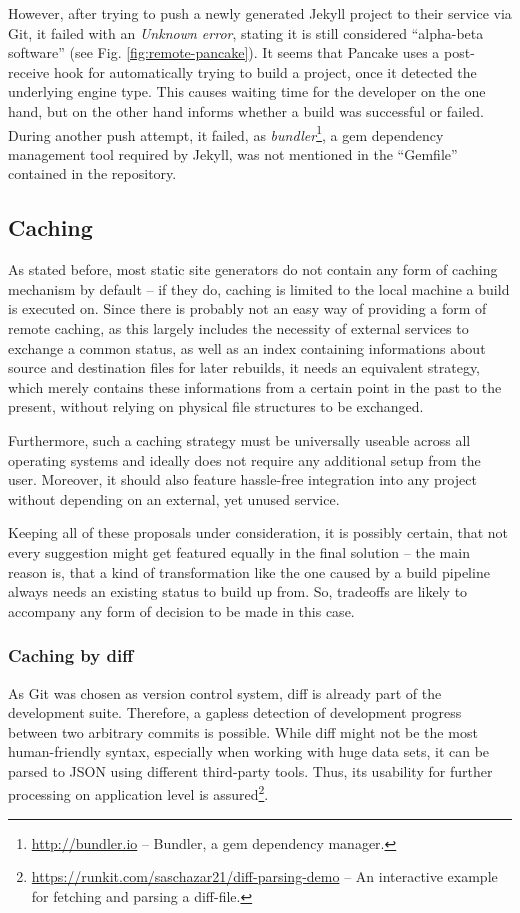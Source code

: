 However, after trying to push a newly generated Jekyll project to their service via Git, it failed with an \emph{Unknown error}, stating it is still considered ``alpha-beta software'' (see Fig. \ref{fig:remote-pancake}). It seems that Pancake uses a post-receive hook for automatically trying to build a project, once it detected the underlying engine type. This causes waiting time for the developer on the one hand, but on the other hand informs whether a build was successful or failed. During another push attempt, it failed, as \emph{bundler}\footnote{\url{http://bundler.io} -- Bundler, a gem dependency manager.}, a gem dependency management tool required by Jekyll, was not mentioned in the ``Gemfile'' contained in the repository.


\subsection{Caching}
\label{sec:solutions-caching}

As stated before, most static site generators do not contain any form of caching mechanism by default -- if they do, caching is limited to the local machine a build is executed on. Since there is probably not an easy way of providing a form of remote caching, as this largely includes the necessity of external services to exchange a common status, as well as an index containing informations about source and destination files for later rebuilds, it needs an equivalent strategy, which merely contains these informations from a certain point in the past to the present, without relying on physical file structures to be exchanged.

Furthermore, such a caching strategy must be universally useable across all operating systems and ideally does not require any additional setup from the user. Moreover, it should also feature hassle-free integration into any project without depending on an external, yet unused service.

Keeping all of these proposals under consideration, it is possibly certain, that not every suggestion might get featured equally in the final solution -- the main reason is, that a kind of transformation like the one caused by a build pipeline always needs an existing status to build up from. So, tradeoffs are likely to accompany any form of decision to be made in this case.

\subsubsection{Caching by diff}
As Git was chosen as version control system, diff is already part of the development suite. Therefore, a gapless detection of development progress between two arbitrary commits is possible. While diff might not be the most human-friendly syntax, especially when working with huge data sets, it can be parsed to JSON using different third-party tools. Thus, its usability for further processing on application level is assured\footnote{\url{https://runkit.com/saschazar21/diff-parsing-demo} -- An interactive example for fetching and parsing a diff-file.}.

